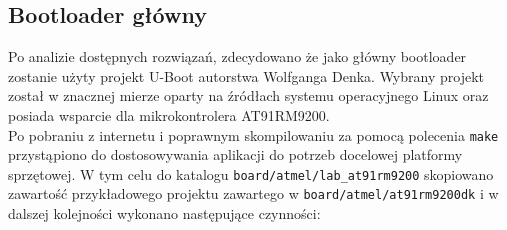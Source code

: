 \documentclass[a4paper,12pt]{book}
\begin{document}
			\subsection{Bootloader główny}
				Po analizie dostępnych rozwiązań, zdecydowano że jako główny bootloader zostanie użyty projekt U-Boot autorstwa Wolfganga Denka\cite{website:uboot}. Wybrany projekt został w znacznej mierze oparty na źródłach systemu operacyjnego Linux oraz posiada wsparcie dla mikrokontrolera AT91RM9200.\\
				Po pobraniu z internetu i poprawnym skompilowaniu za pomocą polecenia \texttt{make} przystąpiono do dostosowywania aplikacji do potrzeb docelowej platformy sprzętowej. W tym celu do katalogu \texttt{board/atmel/lab\_at91rm9200} skopiowano zawartość przykładowego projektu zawartego w \texttt{board/atmel/at91rm9200dk} i w dalszej kolejności wykonano następujące czynności:
\end{document}

